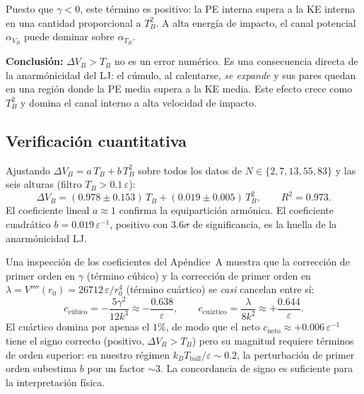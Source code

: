 \documentclass[11pt, a4paper]{article}
\begin{document}
Puesto que $\gamma < 0$, este término es positivo: la PE interna supera a
la KE interna en una cantidad proporcional a $T_B^2$. A alta energía de
impacto, el canal potencial $\alpha_{V_B}$ puede dominar sobre $\alpha_{T_B}$.

\begin{mdframed}[style=resultado]
\textbf{Conclusión:} $\Delta V_B > T_B$ no es un error numérico. Es una
consecuencia directa de la anarmónicidad del LJ: el cúmulo, al
calentarse, \emph{se expande} y sus pares quedan en una región donde la
PE media supera a la KE media. Este efecto crece como $T_B^2$ y domina
el canal interno a alta velocidad de impacto.
\end{mdframed}

\subsection{Verificación cuantitativa}

Ajustando $\Delta V_B = a\,T_B + b\,T_B^2$ sobre todos los datos de
$N \in \{2,7,13,55,83\}$ y las seis alturas (filtro $T_B > 0.1\,\varepsilon$):
\begin{equation}
  \Delta V_B = (0.978 \pm 0.153)\,T_B + (0.019 \pm 0.005)\,T_B^2,
  \qquad R^2 = 0.973.
\end{equation}
El coeficiente lineal $a \approx 1$ confirma la equipartición armónica.
El coeficiente cuadrático $b = 0.019\,\varepsilon^{-1}$, positivo con
$3.6\sigma$ de significancia, es la huella de la anarmónicidad LJ.

Una inspección de los coeficientes del Apéndice~A muestra que la
corrección de primer orden en $\gamma$ (término cúbico) y la corrección
de primer orden en $\lambda = V''''(r_0) = 26712\,\varepsilon/r_0^4$
(término cuártico) se \emph{casi} cancelan entre sí:
\begin{equation}
  c_\text{cúbico} = -\frac{5\gamma^2}{12k^3} \approx -\frac{0.638}{\varepsilon},
  \qquad
  c_\text{cuártico} = \frac{\lambda}{8k^2} \approx +\frac{0.644}{\varepsilon}.
\end{equation}
El cuártico domina por apenas el $1\%$, de modo que el neto
$c_\text{neto} \approx +0.006\,\varepsilon^{-1}$ tiene el signo correcto
(positivo, $\Delta V_B > T_B$) pero su magnitud requiere términos de orden
superior: en nuestro régimen $k_BT_\text{ball}/\varepsilon \sim 0.2$,
la perturbación de primer orden subestima $b$ por un factor $\sim 3$.
La concordancia de signo es suficiente para la interpretación física.

\end{document}
